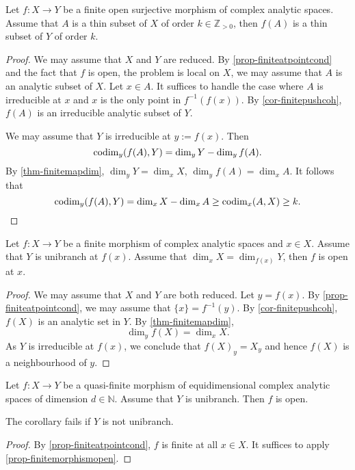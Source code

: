 \begin{corollary}\label{cor-finiteopensurjthinsetpre}
    Let $f:X\rightarrow Y$ be a finite open surjective morphism of complex analytic spaces. Assume that $A$ is a thin subset of $X$ of order $k\in \mathbb{Z}_{>0}$, then $f(A)$ is a thin subset of $Y$ of order $k$.
\end{corollary}
\begin{proof}
    We may assume that $X$ and $Y$ are reduced.
    By \cref{prop-finiteatpointcond} and the fact that $f$ is open, the problem is local on $X$, we may assume that $A$ is an analytic subset of $X$. Let $x\in A$. It suffices to handle the case where $A$ is irreducible at $x$ and $x$ is the only point in $f^{-1}(f(x))$.
    By \cref{cor-finitepushcoh}, $f(A)$ is an irreducible analytic subset of $Y$.

    We may assume that $Y$ is irreducible at $y:=f(x)$. Then
    \[
        \operatorname{codim}_y(f(A),Y)=\dim_y Y-\dim_y f(A).  
    \]
    By \cref{thm-finitemapdim}, $\dim_y Y=\dim_x X$, $\dim_y f(A)=\dim_x A$. It follows that
    \[
        \operatorname{codim}_y(f(A),Y)=\dim_x X-\dim_x A  \geq \operatorname{codim}_x(A,X)\geq k.
    \]
\end{proof}

\begin{proposition}\label{prop-finitemorphismopen}
    Let $f:X\rightarrow Y$ be a finite morphism of complex analytic spaces and $x\in X$. Assume that $Y$ is unibranch at $f(x)$. Assume that $\dim_x X=\dim_{f(x)}Y$, then $f$ is open at $x$.
\end{proposition}
\begin{proof}
    We may assume that $X$ and $Y$ are both reduced. Let $y=f(x)$. By \cref{prop-finiteatpointcond}, we may assume that $\{x\}=f^{-1}(y)$. By \cref{cor-finitepushcoh}, $f(X)$ is an analytic set in $Y$. By \cref{thm-finitemapdim},
    \[
        \dim_y f(X)=\dim_x X.  
    \]
    As $Y$ is irreducible at $f(x)$, we conclude that $f(X)_y=X_y$ and hence $f(X)$ is a neighbourhood of $y$.
\end{proof}
\begin{corollary}\label{cor-quasifiniemoropen}
    Let $f:X\rightarrow Y$ be a quasi-finite morphism of equidimensional complex analytic spaces of dimension $d\in \mathbb{N}$. Assume that $Y$ is unibranch. Then $f$ is open. 
\end{corollary}
The corollary fails if $Y$ is not unibranch.
\begin{proof}
    By \cref{prop-finiteatpointcond}, $f$ is finite at all $x\in X$. It suffices to apply \cref{prop-finitemorphismopen}.
\end{proof}


